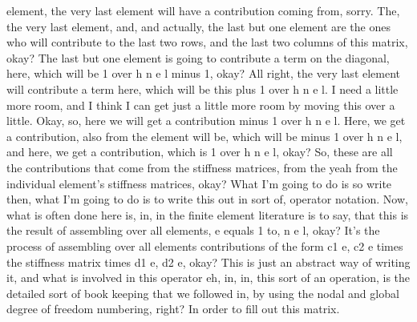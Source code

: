 \documentclass[10pt]{article}
\begin{document}
element, the very last element will have a contribution coming from, sorry. The, the very last element, and, and actually, the last but one element are the ones who will contribute to the last two rows, and the last two columns of this matrix, okay? The last but one element is going to contribute a term on the diagonal, here, which will be 1 over h n e l minus 1, okay? All right, the very last element will contribute a term here, which will be this plus 1 over h n e l. I need a little more room, and I think I can get just a little more room by moving this over a little. Okay, so, here we will get a contribution minus 1 over h n e l. Here, we get a contribution, also from the element will be, which will be minus 1 over h n e l, and here, we get a contribution, which is 1 over h n e l, okay? So, these are all the contributions that come from the stiffness matrices, from the yeah from the individual element's stiffness matrices, okay? What I'm going to do is so write then, what I'm going to do is to write this out in sort of, operator notation. Now, what is often done here is, in, in the finite element literature is to say, that this is the result of assembling over all elements, e equals 1 to, n e l, okay? It's the process of assembling over all elements contributions of the form c1 e, c2 e times the stiffness matrix times d1 e, d2 e, okay? This is just an abstract way of writing it, and what is involved in this operator eh, in, in, this sort of an operation, is the detailed sort of book keeping that we followed in, by using the nodal and global degree of freedom numbering, right? In order to fill out this matrix.
\end{document}
